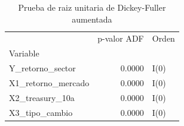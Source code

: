 \begin{table}
\caption{Prueba de raiz unitaria de Dickey-Fuller aumentada}
\label{tab:tabla2_adf}
\begin{tabular}{lrl}
\toprule
 & p-valor ADF & Orden \\
Variable &  &  \\
\midrule
Y_retorno_sector & 0.0000 & I(0) \\
X1_retorno_mercado & 0.0000 & I(0) \\
X2_treasury_10a & 0.0000 & I(0) \\
X3_tipo_cambio & 0.0000 & I(0) \\
\bottomrule
\end{tabular}
\end{table}
